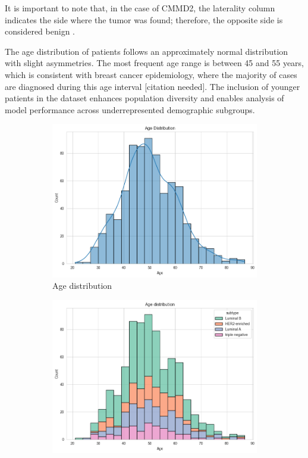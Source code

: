 \documentclass[a4paper,10pt]{book}
\begin{document}
It is important to note that, in the case of CMMD2, the laterality column indicates the side where the tumor was found; therefore, the opposite side is considered benign \cite{cai_online_2023}.

The age distribution of patients follows an approximately normal distribution with slight asymmetries. The most frequent age range is between 45 and 55 years, which is consistent with breast cancer epidemiology, where the majority of cases are diagnosed during this age interval [citation needed]. The inclusion of younger patients in the dataset enhances population diversity and enables analysis of model performance across underrepresented demographic subgroups.

\begin{figure}[h!]
	\centering
	\begin{subfigure}[c]{0.49\textwidth}
		\centering
		\includegraphics[width=\textwidth]{reports//assets/age.png}
		\caption{Age distribution}
		\label{fig:age_dist}
	\end{subfigure}
	\begin{subfigure}[c]{0.49\textwidth}
		\centering
		\includegraphics[width=\textwidth]{reports/assets/age_subtype.png}

\end{subfigure}
\end{figure}
\end{document}
